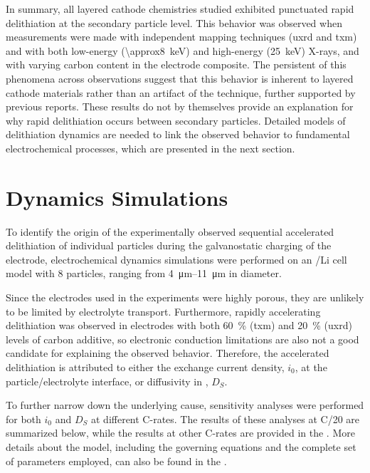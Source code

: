 \documentclass{article}
\begin{document}
In summary, all layered cathode chemistries studied exhibited
punctuated rapid delithiation at the secondary particle level. This
behavior was observed when measurements were made with independent
mapping techniques (\gls{uxrd} and \gls{txm}) and with both low-energy
(\SI{\approx8}{\kilo\electronvolt}) and high-energy
(\SI{25}{\kilo\electronvolt}) X-rays, and with varying carbon content
in the electrode composite. The persistent of this phenomena across
observations suggest that this behavior is inherent to layered cathode
materials rather than an artifact of the technique, further supported
by previous reports\cite{chueh2021}. These
results do not by themselves provide an explanation for why rapid
delithiation occurs between secondary particles. Detailed models of
delithiation dynamics are needed to link the observed behavior to
fundamental electrochemical processes, which are presented in the next
section.

\section{Dynamics Simulations}


To identify the origin of the experimentally observed sequential
accelerated delithiation of individual \nca{} particles during the
galvanostatic charging of the electrode, electrochemical dynamics
simulations were performed on an \nca{}/Li cell model with 8
particles, ranging from \SIrange{4}{11}{\micro\meter} in diameter.

Since the electrodes used in the experiments were highly porous, they
are unlikely to be limited by electrolyte transport. Furthermore,
rapidly accelerating delithiation was observed in electrodes with both
\SI{60}{\percent} (\gls{txm}) and \SI{20}{\percent} (\gls{uxrd})
levels of carbon additive, so electronic conduction limitations are
also not a good candidate for explaining the observed
behavior. Therefore, the accelerated delithiation is attributed to
either the exchange current density, $i_0$, at the
particle/electrolyte interface, or  diffusivity in \nca{},
$D_S$.

To further narrow down the underlying cause, sensitivity analyses were
performed for both $i_0$ and $D_S$ at different C-rates. The results
of these analyses at C/20 are summarized below, while the results at
other C-rates are provided in the . More details about the model,
including the governing equations and the complete set of parameters
employed, can also be found in the .
\end{document}
